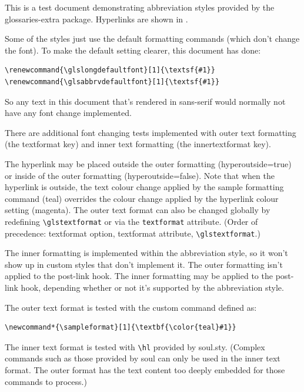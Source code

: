 \documentclass{report}
\renewcommand{\glsabbrvdefaultfont}[1]{\textsf{#1}}
\renewcommand{\glslongdefaultfont}[1]{\textsf{#1}}
\newcommand*{\sampleformat}[1]{\textbf{\color{teal}#1}}
\begin{document}
This is a test document demonstrating abbreviation styles
provided by the \textsf{glossaries-extra} package. Hyperlinks
are shown in 
\makeatletter
\textcolor{\@linkcolor}{\@linkcolor}.
\makeatother

Some of the styles just use the default formatting commands (which don't
change the font). To make the default setting clearer, this document has done:
\begin{verbatim}
\renewcommand{\glslongdefaultfont}[1]{\textsf{#1}}
\renewcommand{\glsabbrvdefaultfont}[1]{\textsf{#1}}
\end{verbatim}
So any text in this document that's rendered in sans-serif would normally not have any font
change implemented.

There are additional font changing tests implemented with outer text formatting
(the textformat key) and inner text formatting (the innertextformat key).

The hyperlink may be placed outside the outer formatting (hyperoutside=true) or
inside of the outer formatting (hyperoutside=false). Note that when the
hyperlink is outside, the text colour change applied by the sample formatting
command (teal) overrides the colour change applied by the hyperlink colour
setting (magenta). The outer text format can also be changed globally
by redefining \verb|\glstextformat| or via the \verb|textformat| attribute.
(Order of precedence: textformat option, textformat attribute,
\verb|\glstextformat|.)

The inner formatting is implemented within the abbreviation style, so it won't
show up in custom styles that don't implement it. The outer formatting isn't
applied to the post-link hook. The inner formatting may be applied to the
post-link hook, depending whether or not it's supported by the abbreviation
style.

The outer text format is tested with the custom command defined as:
\begin{verbatim}
\newcommand*{\sampleformat}[1]{\textbf{\color{teal}#1}}
\end{verbatim}
The inner text format is tested with \verb|\hl| provided by soul.sty.
(Complex commands such as those provided by soul can only be used
in the inner text format. The outer format has the text content too
deeply embedded for those commands to process.)
\end{document}
